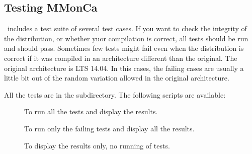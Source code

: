 \subsection{Testing MMonCa}

\MMonCa\ includes a test suite of several test cases. If you want to check the integrity of the distribution, or whether yuor compilation is correct, all tests should be run and should pass. Sometimes few tests might fail even when the distribution is correct if it was compiled in an architecture different than the original. The original architecture is  LTS 14.04. In this cases, the failing cases are usually a little bit out of the random variation allowed in the original architecture. 

All the tests are in the  subdirectory. The following scripts are available:

\begin{description}
\item [] To run all the tests and display the results.
\item [] To run only the failing tests and display all the results.
\item [] To display the results only, no running of tests.
\end{description}
